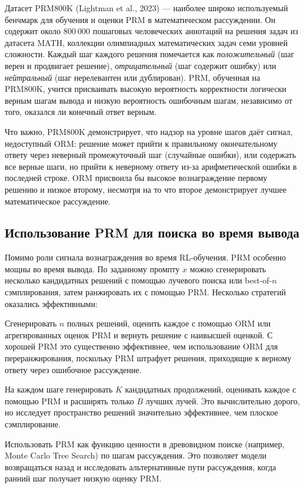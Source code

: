 \begin{example}
\label{ex:prm800k}
Датасет PRM800K (Lightman et al., 2023) --- наиболее широко используемый бенчмарк для обучения и оценки PRM в математическом рассуждении. Он содержит около $800~000$ пошаговых человеческих аннотаций на решения задач из датасета MATH, коллекции олимпиадных математических задач семи уровней сложности. Каждый шаг каждого решения помечается как \emph{положительный} (шаг верен и продвигает решение), \emph{отрицательный} (шаг содержит ошибку) или \emph{нейтральный} (шаг нерелевантен или дублирован). PRM, обученная на PRM800K, учится присваивать высокую вероятность корректности логически верным шагам вывода и низкую вероятность ошибочным шагам, независимо от того, оказался ли конечный ответ верным.

Что важно, PRM800K демонстрирует, что надзор на уровне шагов даёт сигнал, недоступный ORM: решение может прийти к правильному окончательному ответу через неверный промежуточный шаг (случайные ошибки), или содержать все верные шаги, но прийти к неверному ответу из-за арифметической ошибки в последней строке. ORM присвоила бы высокое вознаграждение первому решению и низкое второму, несмотря на то что второе демонстрирует лучшее математическое рассуждение.
\end{example}

\subsection{Использование PRM для поиска во время вывода}

Помимо роли сигнала вознаграждения во время RL-обучения, PRM особенно мощны во время вывода. По заданному промпту $x$ можно сгенерировать несколько кандидатных решений с помощью лучевого поиска или best-of-$n$ сэмплирования, затем ранжировать их с помощью PRM. Несколько стратегий оказались эффективными:

\begin{description}[leftmargin=!,labelwidth=3.5cm,align=parleft]
  \item[Переранжирование best-of-$n$] Сгенерировать $n$ полных решений, оценить каждое с помощью ORM или агрегированных оценок PRM и вернуть решение с наивысшей оценкой. С хорошей PRM это существенно эффективнее, чем использование ORM для переранжирования, поскольку PRM штрафует решения, приходящие к верному ответу через ошибочное рассуждение.
  \item[Пошаговый лучевой поиск] На каждом шаге генерировать $K$ кандидатных продолжений, оценивать каждое с помощью PRM и расширять только $B$ лучших лучей. Это вычислительно дорого, но исследует пространство решений значительно эффективнее, чем плоское сэмплирование.
  \item[Древовидный поиск под руководством PRM] Использовать PRM как функцию ценности в древовидном поиске (например, Monte Carlo Tree Search) по шагам рассуждения. Это позволяет модели возвращаться назад и исследовать альтернативные пути рассуждения, когда ранний шаг получает низкую оценку PRM.
\end{description}

